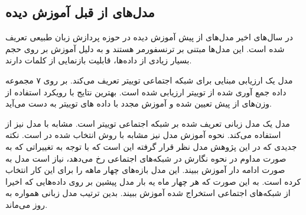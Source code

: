 \subsection[مدل‌های از قبل آموزش دیده]{مدل‌های از قبل آموزش دیده}
	
	
	در سال‌های اخیر مدل‌های از پیش آموزش دیده در حوزه پردازش زبان طبیعی تعریف شده است. این مدل‌ها مبتنی بر ترنسفورمر هستند و به دلیل آموزش بر روی حجم بسیار زیادی از دادە‌ها، قابلیت بازنمایی از کلمات
دارند. 

مدل 
\cite{barbieri-etal-2020-tweeteval}
یک ارزیابی مبنایی 
برای شبکه اجتماعی توییتر تعریف می‌کند. 
 بر روی ۷ مجموعه داده جمع آوری شده از توییتر ارزیابی شده است. بهترین نتایج با رویکرد استفاده از وزن‌های از پیش تعیین شده
و آموزش مجدد با دادە های توییتر به دست می‌آید.

مدل
\cite{loureiro-etal-2022-timelms}
 یک مدل زبانی تعریف شده بر شبکه اجتماعی توییتر است. مشابه با
مدل  نیز از  استفاده می‌کند. نحوه آموزش مدل نیز مشابه با روش انتخاب شده در
 است. نکته جدیدی که در این پژوهش مدل نظر قرار گرفته این است که با توجه به تغییراتی که به صورت مداوم در نحوه نگارش در شبکه‌‌های اجتماعی رخ می‌دهد، نیاز است مدل به صورت ادامه دار آموزش ببیند. این مدل بازە‌های چهار ماهه را برای این کار انتخاب کرده است. به این صورت که هر چهار ماه یه بار مدل پیشین بر روی دادە‌هایی که اخیرا از شبکه‌های اجتماعی استخراج شده آموزش ببیند. بدین ترتیب مدل زبانی همواره به روز می‌ماند.

